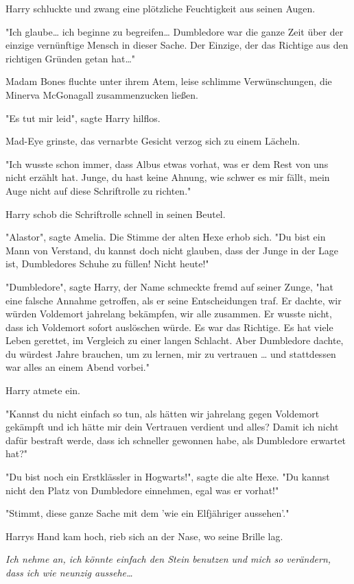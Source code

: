 {Harry schluckte und zwang eine plötzliche Feuchtigkeit aus seinen Augen.

"Ich glaube… ich beginne zu begreifen… Dumbledore war die ganze Zeit über der einzige vernünftige Mensch in dieser Sache. Der Einzige, der das Richtige aus den richtigen Gründen getan hat…"

Madam Bones fluchte unter ihrem Atem, leise schlimme Verwünschungen, die Minerva McGonagall zusammenzucken ließen.

"Es tut mir leid", sagte Harry hilflos.

Mad-Eye grinste, das vernarbte Gesicht verzog sich zu einem Lächeln.

"Ich wusste schon immer, dass Albus etwas vorhat, was er dem Rest von uns nicht erzählt hat. Junge, du hast keine Ahnung, wie schwer es mir fällt, mein Auge nicht auf diese Schriftrolle zu richten."

Harry schob die Schriftrolle schnell in seinen Beutel.

"Alastor", sagte Amelia. Die Stimme der alten Hexe erhob sich. "Du bist ein Mann von Verstand, du kannst doch nicht glauben, dass der Junge in der Lage ist, Dumbledores Schuhe zu füllen! Nicht heute!"

"Dumbledore", sagte Harry, der Name schmeckte fremd auf seiner Zunge, "hat eine falsche Annahme getroffen, als er seine Entscheidungen traf. Er dachte, wir würden Voldemort jahrelang bekämpfen, wir alle zusammen. Er wusste nicht, dass ich Voldemort sofort auslöschen würde. Es war das Richtige. Es hat viele Leben gerettet, im Vergleich zu einer langen Schlacht. Aber Dumbledore dachte, du würdest Jahre brauchen, um zu lernen, mir zu vertrauen … und stattdessen war alles an einem Abend vorbei."

Harry atmete ein.

"Kannst du nicht einfach so tun, als hätten wir jahrelang gegen Voldemort gekämpft und ich hätte mir dein Vertrauen verdient und alles? Damit ich nicht dafür bestraft werde, dass ich schneller gewonnen habe, als Dumbledore erwartet hat?"

"Du bist noch ein Erstklässler in Hogwarts!", sagte die alte Hexe. "Du kannst nicht den Platz von Dumbledore einnehmen, egal was er vorhat!"

"Stimmt, diese ganze Sache mit dem 'wie ein Elfjähriger aussehen'."

Harrys Hand kam hoch, rieb sich an der Nase, wo seine Brille lag.

\emph{Ich nehme an, ich könnte einfach den Stein benutzen und mich so verändern, dass ich wie neunzig aussehe…}

}
